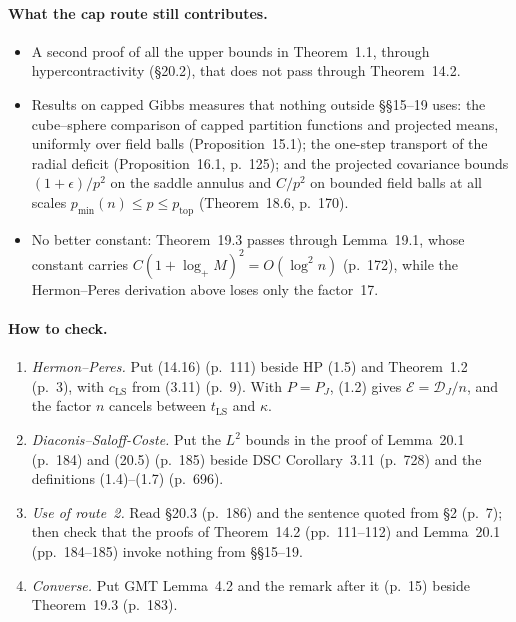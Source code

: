 \documentclass[11pt]{article}
\newcommand{\D}{\mathcal{D}}
\newcommand{\ploc}[2]{#1}
\begin{document}
\paragraph{What the cap route still contributes.}
\begin{itemize}
\item A second proof of all the upper bounds in Theorem~1.1, through
 hypercontractivity (\S20.2), that does not pass through Theorem~14.2.
\item Results on capped Gibbs measures that nothing outside \S\S15--19 uses:
 the cube--sphere comparison of capped partition functions and projected
 means, uniformly over field balls
 (\ploc{Proposition~15.1}{cap-static.tex:299--309}); the one-step transport of
 the radial deficit (\ploc{Proposition~16.1, p.~125}{cap-multiscale.tex:80});
 and the projected covariance bounds $(1+\epsilon)/p^2$ on the saddle annulus
 and $C/p^2$ on bounded field balls at all scales
 $p_{\min}(n)\le p\le p_{\mathrm{top}}$
 (\ploc{Theorem~18.6, p.~170}{cap-initialization.tex:976--989}).
\item No better constant: Theorem~19.3 passes through Lemma~19.1, whose
 constant carries $C(1+\log_+M)^2=O(\log^2n)$
 \ploc{(p.~172)}{cap-entropy.tex:58--62}, while the Hermon--Peres derivation
 above loses only the factor~17.
\end{itemize}

\paragraph{How to check.}
\begin{enumerate}
\item \emph{Hermon--Peres.} Put (14.16) (p.~111) beside HP (1.5) and
 Theorem~1.2 (p.~3), with $c_{\mathrm{LS}}$ from (3.11) (p.~9). With $P=P_J$,
 (1.2) gives $\mathcal E=\D_J/n$, and the factor $n$ cancels between
 $t_{\mathrm{LS}}$ and $\kappa$.
\item \emph{Diaconis--Saloff-Coste.} Put the $L^2$ bounds in the proof of
 Lemma~20.1 \ploc{(p.~184)}{dynamics.tex:83--93} and (20.5) (p.~185) beside
 DSC Corollary~3.11 (p.~728) and the definitions (1.4)--(1.7) (p.~696).
\item \emph{Use of route~2.} Read \ploc{\S20.3 (p.~186)}{dynamics.tex:196--201}
 and the sentence quoted from \ploc{\S2 (p.~7)}{model.tex:67--72}; then check that the proofs of Theorem~14.2
 \ploc{(pp.~111--112)}{profile-entropy.tex:614--690} and Lemma~20.1
 \ploc{(pp.~184--185)}{dynamics.tex:51--148} invoke nothing from \S\S15--19.
\item \emph{Converse.} Put GMT Lemma~4.2 and the remark after it (p.~15) beside
 Theorem~19.3 (p.~183).
\end{enumerate}
\end{document}
